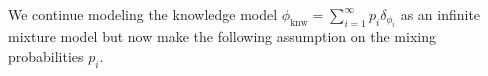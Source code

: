 \documentclass[11pt]{article}
\theoremstyle{plain}
\theoremstyle{definition}
\newcommand{\knwModel}{\phi_{\text{knw}}}
\newcommand{\basemeasure}{\pi_{\text{knw}}}
\begin{document}







We continue modeling the knowledge model \( \knwModel = \sum_{i=1}^{\infty} p_i \delta_{\phi_i} \) as an infinite mixture model but now make the following assumption on the mixing probabilities \( p_i \). 
\end{document}
